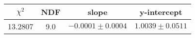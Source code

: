\begin{tabular}{|c|c|c|c|}

\hline
$\chi^{2}$ & NDF & slope & y-intercept  \\
\hline
13.2807 & 9.0 & $-0.0001\pm0.0004$ & $1.0039\pm0.0511$ \\
\hline

\end{tabular}